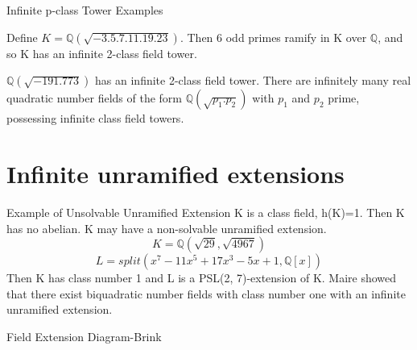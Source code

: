 \documentclass[10pt]{beamer}
\begin{document}
\begin{frame}{Infinite p-class Tower Examples}
\begin{example}
    Define $K=\mathbb{Q}(\sqrt{-3.5.7.11.19.23})$. Then 6 odd primes ramify in K over $\mathbb{Q}$, and so K has an infinite 2-class field tower. 
\end{example}
\begin{example}[Schoof]
$\mathbb{Q}(\sqrt{-191.773})$ has an infinite 2-class field tower. There are infinitely many real quadratic number fields of the form $\mathbb{Q}(\sqrt{p_1.p_2})$ with $p_1$ and $p_2$ prime, possessing infinite class field towers. 
\end{example}
\end{frame}
\section{Infinite unramified extensions}
\begin{frame}{Example of Unsolvable Unramified Extension}
K is a class field, h(K)=1. Then K has no abelian.
K may have a non-solvable unramified extension.
\begin{equation}
   K=\mathbb{Q}(\sqrt{29},\sqrt{4967}) 
\end{equation}
\begin{equation}
   L=split(x^7 - 11x^5 + 17x^3 - 5x + 1,\mathbb{Q}[x])
\end{equation}
Then K has class number 1 and L is a PSL(2, 7)-extension of K.
Maire showed that there exist biquadratic number fields with class number one with an infinite unramified extension.
\end{frame}

\begin{frame}{Field Extension Diagram-Brink}
  \begin{center}
\end{center}  
\end{frame}
\end{document}
